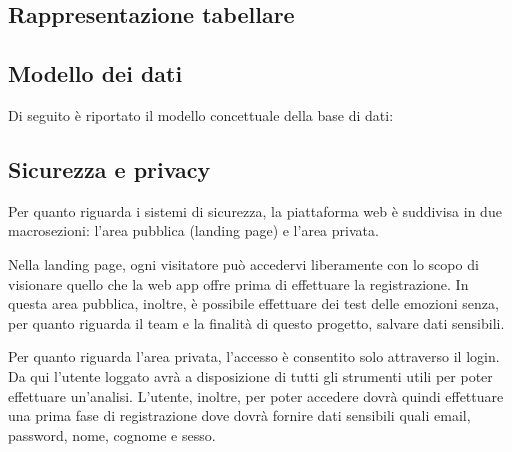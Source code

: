 \subsection{Rappresentazione tabellare}


\subsection{Modello dei dati}
Di seguito è riportato il modello concettuale della base di dati:


\subsection{Sicurezza e privacy}
Per quanto riguarda i sistemi di sicurezza, la piattaforma web è suddivisa in 
due macrosezioni: l'area pubblica (landing page) e l'area privata.

Nella landing page, ogni visitatore può accedervi liberamente con lo scopo di 
visionare quello che la web app offre prima di effettuare la registrazione. In 
questa area pubblica, inoltre, è possibile effettuare dei test delle emozioni 
senza, per quanto riguarda il team e la finalità di questo progetto, salvare 
dati sensibili.

Per quanto riguarda l'area privata, l'accesso è consentito solo attraverso il 
login. Da qui l'utente loggato avrà a disposizione di tutti gli strumenti utili 
per poter effettuare un'analisi. L'utente, inoltre, per poter accedere dovrà 
quindi effettuare una prima fase di registrazione dove dovrà fornire dati 
sensibili quali email, password, nome, cognome e sesso.

